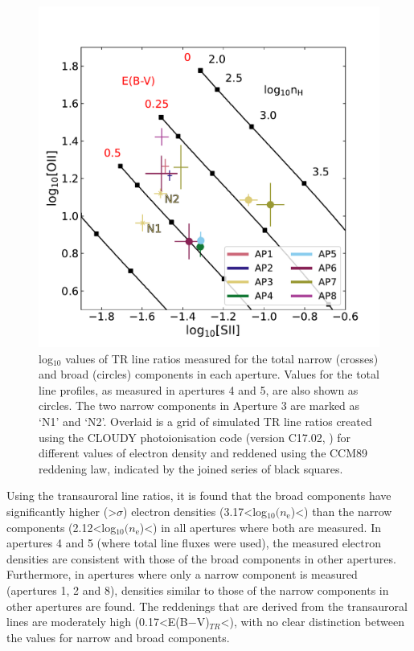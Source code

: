 \begin{figure}[!ht]
    \centering
	\includegraphics[width=0.75\linewidth]{figures/xshooter_ic5063/ddd_grid_zoomed.pdf}
	\caption[Transauroral {[}OII{]} and {[}SII{]} line ratio diagram for IC, showing both measured values and those predicted from photoionisation modelling.]{log$_{10}$ values of TR line ratios measured for the total narrow (crosses) and broad (circles) components in each aperture. Values for the total line profiles, as measured in apertures 4 and 5, are also shown as circles. The two narrow components in Aperture 3 are marked as `N1' and `N2'. Overlaid is a grid of simulated TR line ratios created using the \textsc{CLOUDY} photoionisation code (version C17.02, \citealt{Ferland2017}) for different values of electron density and reddened using the CCM89 reddening law, indicated by the joined series of black squares.}
	\label{fig: xshooter_ic5063: tr_grid}
\end{figure}

Using the transauroral line ratios, it is found that the broad components have significantly higher (\mbox{\textgreater{}$\sigma$}) electron densities (\mbox{3.17\;\textless\;log$_{10}(n_\mathrm{e}$\;[cm$^{-3}$])\;\textless{}}) than the narrow components (\mbox{2.12\;\textless\;log$_{10}(n_\mathrm{e}$\;[cm$^{-3}$])\;\textless{}}) in all apertures where both are measured. In apertures 4 and 5 (where total line fluxes were used), the measured electron densities are consistent with those of the broad components in other apertures. Furthermore, in apertures where only a narrow component is measured (apertures 1, 2 and 8), densities similar to those of the narrow components in other apertures are found. The reddenings that are derived from the transauroral lines are moderately high (\mbox{0.17\;\textless\;E(B$-$V)$_{TR}$\;\textless{}}), with no clear distinction between the values for narrow and broad components.

